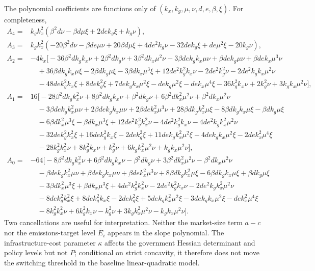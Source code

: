 The polynomial coefficients are functions only of $(k_x,k_g,\mu,\nu,d,e,\beta,\xi)$. For completeness,
\begin{align}
A_4={}&k_gk_x^2\left(\beta^2d\nu-\beta d\mu\xi+2de k_g\xi+k_g\nu\right),\\
A_3={}&k_gk_x^2\left(-20\beta^2d\nu-\beta de\mu\nu+20\beta d\mu\xi+4de^2k_g\nu-32de k_g\xi+de\mu^2\xi-20k_g\nu\right),
\end{align}
\begin{align}
A_2={}&-4k_x\Big[
-36\beta^2dk_gk_x\nu+2\beta^2dk_g\nu+3\beta^2dk_x\mu^2\nu
-3\beta de k_gk_x\mu\nu+\beta de k_g\mu\nu+\beta de k_x\mu^3\nu\\
&\quad+36\beta dk_gk_x\mu\xi-2\beta dk_g\mu\xi-3\beta dk_x\mu^3\xi
+12de^2k_g^2k_x\nu-2de^2k_g^2\nu-2de^2k_gk_x\mu^2\nu\\
&\quad-48de k_g^2k_x\xi+8de k_g^2\xi+7de k_gk_x\mu^2\xi-de k_g\mu^2\xi-de k_x\mu^4\xi
-36k_g^2k_x\nu+2k_g^2\nu+3k_gk_x\mu^2\nu\Big],
\end{align}
\begin{align}
A_1={}&16\Big[
-28\beta^2dk_gk_x^2\nu+8\beta^2dk_gk_x\nu+\beta^2dk_g\nu+6\beta^2dk_x^2\mu^2\nu+\beta^2dk_x\mu^2\nu\\
&\quad-3\beta de k_gk_x^2\mu\nu+2\beta de k_gk_x\mu\nu+2\beta de k_x^2\mu^3\nu
+28\beta dk_gk_x^2\mu\xi-8\beta dk_gk_x\mu\xi-\beta dk_g\mu\xi\\
&\quad-6\beta dk_x^2\mu^3\xi-\beta dk_x\mu^3\xi+12de^2k_g^2k_x^2\nu-4de^2k_g^2k_x\nu-4de^2k_gk_x^2\mu^2\nu\\
&\quad-32de k_g^2k_x^2\xi+16de k_g^2k_x\xi-2de k_g^2\xi+11de k_gk_x^2\mu^2\xi-4de k_gk_x\mu^2\xi-2de k_x^2\mu^4\xi\\
&\quad-28k_g^2k_x^2\nu+8k_g^2k_x\nu+k_g^2\nu+6k_gk_x^2\mu^2\nu+k_gk_x\mu^2\nu\Big],
\end{align}
\begin{align}
A_0={}&-64\Big[
-8\beta^2dk_gk_x^2\nu+6\beta^2dk_gk_x\nu-\beta^2dk_g\nu+3\beta^2dk_x^2\mu^2\nu-\beta^2dk_x\mu^2\nu\\
&\quad-\beta de k_gk_x^2\mu\nu+\beta de k_gk_x\mu\nu+\beta de k_x^2\mu^3\nu
+8\beta dk_gk_x^2\mu\xi-6\beta dk_gk_x\mu\xi+\beta dk_g\mu\xi\\
&\quad-3\beta dk_x^2\mu^3\xi+\beta dk_x\mu^3\xi+4de^2k_g^2k_x^2\nu-2de^2k_g^2k_x\nu-2de^2k_gk_x^2\mu^2\nu\\
&\quad-8de k_g^2k_x^2\xi+8de k_g^2k_x\xi-2de k_g^2\xi+5de k_gk_x^2\mu^2\xi-3de k_gk_x\mu^2\xi-de k_x^2\mu^4\xi\\
&\quad-8k_g^2k_x^2\nu+6k_g^2k_x\nu-k_g^2\nu+3k_gk_x^2\mu^2\nu-k_gk_x\mu^2\nu\Big].
\end{align}
Two cancellations are useful for interpretation. Neither the market-size term $a-c$ nor the emissions-target level $\bar E_i$ appears in the slope polynomial. The infrastructure-cost parameter $\kappa$ affects the government Hessian determinant and policy levels but not $P$; conditional on strict concavity, it therefore does not move the switching threshold in the baseline linear-quadratic model.

